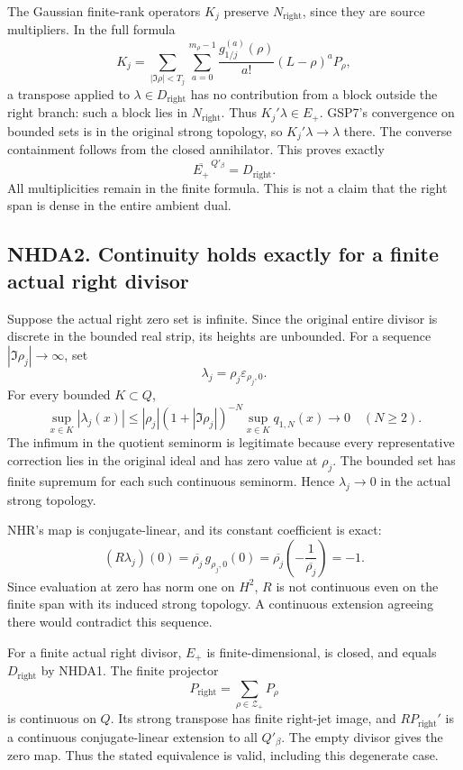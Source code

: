 The Gaussian finite-rank operators \(K_j\) preserve
\(N_{\mathrm{right}}\), since they are source multipliers. In the full
formula \[
K_j=\sum_{|\Im\rho|<T_j}\sum_{a=0}^{m_\rho-1}
\frac{g_{1/j}^{(a)}(\rho)}{a!}(L-\rho)^aP_\rho,
\] a transpose applied to \(\lambda\in D_{\mathrm{right}}\) has no
contribution from a block outside the right branch: such a block lies in
\(N_{\mathrm{right}}\). Thus \(K_j'\lambda\in E_+\). GSP7's convergence
on bounded sets is in the original strong topology, so
\(K_j'\lambda\to\lambda\) there. The converse containment follows from
the closed annihilator. This proves exactly \[
\overline{E_+}^{\,Q'_\beta}=D_{\mathrm{right}}.
\] All multiplicities remain in the finite formula. This is not a claim
that the right span is dense in the entire ambient dual.

\subsection{NHDA2. Continuity holds exactly for a finite actual right
divisor}\label{nhda2.-continuity-holds-exactly-for-a-finite-actual-right-divisor}

Suppose the actual right zero set is infinite. Since the original entire
divisor is discrete in the bounded real strip, its heights are
unbounded. For a sequence \(|\Im\rho_j|\to\infty\), set \[
\lambda_j=\rho_j\varepsilon_{\rho_j,0}.
\] For every bounded \(K\subset Q\), \[
\sup_{x\in K}|\lambda_j(x)|
\le
|\rho_j|(1+|\Im\rho_j|)^{-N}
\sup_{x\in K}q_{1,N}(x)\to0
\quad(N\ge2).
\] The infimum in the quotient seminorm is legitimate because every
representative correction lies in the original ideal and has zero value
at \(\rho_j\). The bounded set has finite supremum for each such
continuous seminorm. Hence \(\lambda_j\to0\) in the actual strong
topology.

NHR's map is conjugate-linear, and its constant coefficient is exact: \[
(R\lambda_j)(0)=
\overline{\rho_j}\,g_{\rho_j,0}(0)
=
\overline{\rho_j}\left(-\frac1{\overline{\rho_j}}\right)=-1.
\] Since evaluation at zero has norm one on \(H^2\), \(R\) is not
continuous even on the finite span with its induced strong topology. A
continuous extension agreeing there would contradict this sequence.

For a finite actual right divisor, \(E_+\) is finite-dimensional, is
closed, and equals \(D_{\mathrm{right}}\) by NHDA1. The finite projector
\[
P_{\mathrm{right}}=\sum_{\rho\in\mathscr Z_+}P_\rho
\] is continuous on \(Q\). Its strong transpose has finite right-jet
image, and \(R P_{\mathrm{right}}'\) is a continuous conjugate-linear
extension to all \(Q'_\beta\). The empty divisor gives the zero map.
Thus the stated equivalence is valid, including this degenerate case.


